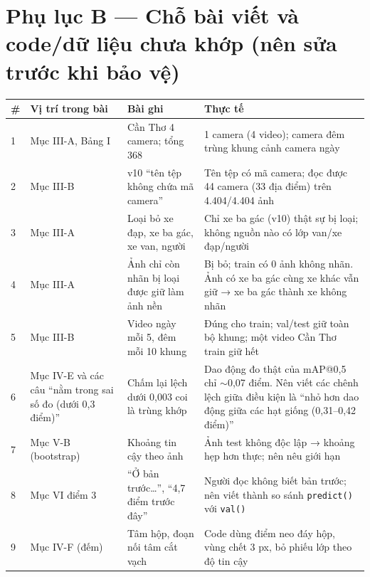\documentclass[11pt,a4paper]{article}
\begin{document}
\section{Phụ lục B — Chỗ bài viết và code/dữ liệu chưa khớp (nên sửa trước khi bảo vệ)}
{\small\begin{longtable}{p{0.4cm}p{3.4cm}p{4.6cm}p{6.0cm}}
\toprule
\textbf{\#} & \textbf{Vị trí trong bài} & \textbf{Bài ghi} & \textbf{Thực tế}\\\midrule
1 & Mục III-A, Bảng I & Cần Thơ 4 camera; tổng 368 & 1 camera (4 video); camera đêm trùng khung cảnh camera ngày\\
2 & Mục III-B & v10 “tên tệp không chứa mã camera” & Tên tệp có mã camera; đọc được 44 camera (33 địa điểm) trên 4.404/4.404 ảnh\\
3 & Mục III-A & Loại bỏ xe đạp, xe ba gác, xe van, người & Chỉ xe ba gác (v10) thật sự bị loại; không nguồn nào có lớp van/xe đạp/người\\
4 & Mục III-A & Ảnh chỉ còn nhãn bị loại được giữ làm ảnh nền & Bị bỏ; train có 0 ảnh không nhãn. Ảnh có xe ba gác cùng xe khác vẫn giữ → xe ba gác thành xe không nhãn\\
5 & Mục III-B & Video ngày mỗi 5, đêm mỗi 10 khung & Đúng cho train; val/test giữ toàn bộ khung; một video Cần Thơ train giữ hết\\
6 & Mục IV-E và các câu “nằm trong sai số đo (dưới 0,3 điểm)” & Chấm lại lệch dưới 0,003 coi là trùng khớp & Dao động đo thật của mAP@0,5 chỉ $\sim$0,07 điểm. Nên viết các chênh lệch giữa điều kiện là “nhỏ hơn dao động giữa các hạt giống (0,31–0,42 điểm)”\\
7 & Mục V-B (bootstrap) & Khoảng tin cậy theo ảnh & Ảnh test không độc lập → khoảng hẹp hơn thực; nên nêu giới hạn\\
8 & Mục VI điểm 3 & “Ở bản trước…”, “4,7 điểm trước đây” & Người đọc không biết bản trước; nên viết thành so sánh \texttt{predict()} với \texttt{val()}\\
9 & Mục IV-F (đếm) & Tâm hộp, đoạn nối tâm cắt vạch & Code dùng điểm neo đáy hộp, vùng chết 3 px, bỏ phiếu lớp theo độ tin cậy\\
\bottomrule
\end{longtable}}
\end{document}
